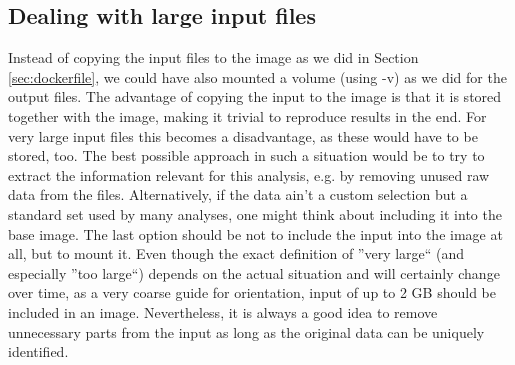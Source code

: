 \documentclass[a4paper, twoside, 11pt]{article}
\begin{document}
\subsection{Dealing with large input files}
Instead of copying the input files to the image as we did in Section \ref{sec:dockerfile}, 
we could have also mounted a volume (using -v) as we did for the output files. 
The advantage of copying the input to the image is that it is stored together with the image, 
making it trivial to reproduce results in the end. 
For very large input files this becomes a disadvantage, as these would have to be stored, too. 
The best possible approach in such a situation would be to try to extract 
the information relevant for this analysis, e.g. by removing unused raw data from the files. 
Alternatively, if the data ain't a custom selection 
but a standard set used by many analyses, one might think about including it into the base image. 
The last option should be not to include the input into the image at all, but to mount it. 
Even though the exact definition of ''very large`` (and especially ''too large``) 
depends on the actual situation and will certainly change over time, 
as a very coarse guide for orientation, input of up to 2 GB should be included in an image. 
Nevertheless, it is always a good idea to remove unnecessary parts from the input 
as long as the original data can be uniquely identified. 
\end{document}
